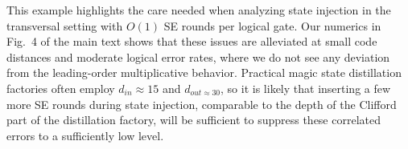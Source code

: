 This example highlights the care needed when analyzing state injection in the transversal setting with $O(1)$ SE rounds per logical gate.
%
Our numerics in Fig.~4 of the main text shows that these issues are alleviated at small code distances and moderate logical error rates, where we do not see any deviation from the leading-order multiplicative behavior.
%
Practical magic state distillation factories often employ $d_{in}\approx 15$ and $d_{out\approx 30}$, so it is likely that inserting a few more SE rounds during state injection, comparable to the depth of the Clifford part of the distillation factory, will be sufficient to suppress these correlated errors to a sufficiently low level.
